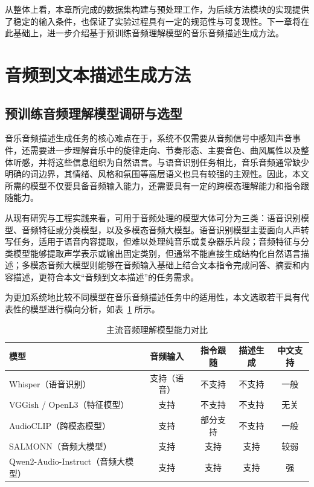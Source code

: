 从整体上看，本章所完成的数据集构建与预处理工作，为后续方法模块的实现提供了稳定的输入条件，也保证了实验过程具有一定的规范性与可复现性。下一章将在此基础上，进一步介绍基于预训练音频理解模型的音乐音频描述生成方法。

\newpage

\section{音频到文本描述生成方法}

\subsection{预训练音频理解模型调研与选型}

音乐音频描述生成任务的核心难点在于，系统不仅需要从音频信号中感知声音事件，还需要进一步理解音乐中的旋律走向、节奏形态、主要音色、曲风属性以及整体听感，并将这些信息组织为自然语言。与语音识别任务相比，音乐音频通常缺少明确的词边界，其情绪、风格和氛围等高层语义也具有较强的主观性。因此，本文所需的模型不仅要具备音频输入能力，还需要具有一定的跨模态理解能力和指令跟随能力\cite{yang2011musicemotion,panda2023audiofeatures,tang2023salmonn,chu2024qwen2audio}。

从现有研究与工程实践来看，可用于音频处理的模型大体可分为三类：语音识别模型、音频特征或分类模型，以及多模态音频大模型\cite{radford2022whisper,hershey2017cnn,cramer2019openl3,guzhov2022audioclip,tang2023salmonn,chu2024qwen2audio}。语音识别模型主要面向人声转写任务，适用于语音内容提取，但难以处理纯音乐或复杂器乐片段；音频特征与分类模型能够提取声学表示或输出固定类别，但通常不能直接生成结构化自然语言描述；多模态音频大模型则能够在音频输入基础上结合文本指令完成问答、摘要和内容描述，更符合本文“音频到文本描述”的任务需求。

为更加系统地比较不同模型在音乐音频描述任务中的适用性，本文选取若干具有代表性的模型进行横向分析，如表~\ref{tab:audio-models} 所示。

\begin{table}[htbp]
  \centering
  \caption{主流音频理解模型能力对比}
  \label{tab:audio-models}
  \begin{tabular}{lcccc}
    \hline
    模型 & 音频输入 & 指令跟随 & 描述生成 & 中文支持 \\
    \hline
    Whisper（语音识别）\cite{radford2022whisper} & 支持（语音） & 不支持 & 不支持 & 一般 \\
    VGGish / OpenL3（特征模型）\cite{hershey2017cnn,cramer2019openl3} & 支持 & 不支持 & 不支持 & 无关 \\
    AudioCLIP（跨模态模型）\cite{guzhov2022audioclip} & 支持 & 部分支持 & 不支持 & 一般 \\
    SALMONN（音频大模型）\cite{tang2023salmonn} & 支持 & 支持 & 支持 & 较弱 \\
    Qwen2-Audio-Instruct（音频大模型）\cite{chu2024qwen2audio} & 支持 & 支持 & 支持 & 强 \\
    \hline
  \end{tabular}
\end{table}

